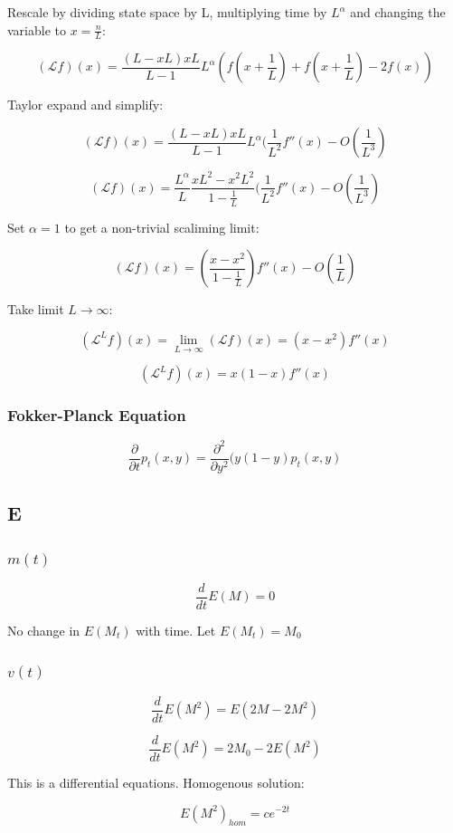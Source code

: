 \documentclass{article}
\begin{document}
Rescale by dividing state space by L, multiplying time by $L^\alpha$ and changing the variable to $x=\frac{n}{L}$:

$$(\mathcal{L}f)(x) = \frac{(L-xL)xL}{L-1}L^\alpha(f(x+\frac{1}{L}) + f(x+\frac{1}{L}) - 2f(x))$$

Taylor expand and simplify:

$$(\mathcal{L}f)(x) = \frac{(L-xL)xL}{L-1}L^\alpha(\frac{1}{L^2}f''(x) - O(\frac{1}{L^3})$$

$$(\mathcal{L}f)(x) = \frac{L^\alpha}{L} \frac{xL^2 - x^2L^2}{1-\frac{1}{L}}(\frac{1}{L^2}f''(x) - O(\frac{1}{L^3})$$

Set $\alpha=1$ to get a non-trivial scaliming limit:

$$(\mathcal{L}f)(x) = (\frac{x - x^2}{1-\frac{1}{L}})f''(x) - O(\frac{1}{L})$$

Take limit $L \to \infty$:

$$(\mathcal{L}^Lf)(x) = \lim_{L \to \infty} (\mathcal{L}f)(x) = (x - x^2)f''(x)$$

$$(\mathcal{L}^Lf)(x) = x(1 - x)f''(x)$$

\subsubsection{Fokker-Planck Equation}

$$\frac{\partial}{\partial t}p_t(x,y) = \frac{\partial^2}{\partial y^2} (y(1-y) p_t(x,y)$$

\subsection{E}

\subsubsection{$m(t)$}

$$\frac{d}{dt}E(M) = 0$$

No change in $E(M_t)$ with time. Let $E(M_t) = M_0$

\subsubsection{$v(t)$}

$$\frac{d}{dt}E(M^2) = E(2M - 2M^2)$$

$$\frac{d}{dt}E(M^2) = 2M_0 - 2E(M^2)$$

This is a differential equations. Homogenous solution:

$$E(M^2)_{hom} = c e^{-2t}$$
\end{document}

